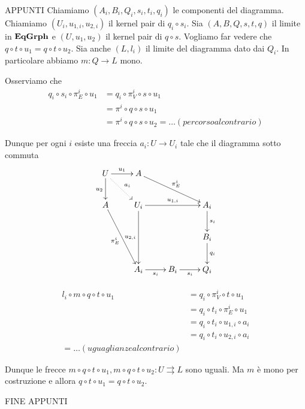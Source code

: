 APPUNTI
Chiamiamo $(A_i, B_i, Q_i, s_i, t_i, q_i)$ le componenti del diagramma. Chiamiamo $(U_i, u_{1, i} , u_{2,i})$ il kernel pair di $q_i\circ s_i$.  Sia $(A, B, Q, s,t,q )$ il limite in $\mathbf{EqGrph}$ e $(U, u_1, u_2)$ il kernel pair di $q\circ s$. Vogliamo far vedere che $q\circ t \circ u_1= q\circ t\circ u_2$. Sia anche $(L, l_i)$ il limite del diagramma dato dai $Q_i$. In particolare abbiamo $m\colon Q\to L$ mono.

Osserviamo che 
\begin{align*}
q_i\circ s_i\circ \pi^i_E\circ u_1 &= q_i\circ \pi^i_V\circ s\circ u_1\\&= \pi^i\circ q\circ s\circ u_1\\&=\pi^i\circ q\circ s\circ u_2=\dots (percorso al contrario)
\end{align*}

Dunque per ogni $i$ esiste una freccia $a_i\colon U\to U_{i}$ tale che il diagramma sotto commuta
\[
\xymatrix{U \ar@{.>}[dr]^{a_i}\ar[r]^{u_1} \ar[d]_{u_2}& A \ar[drr]^{\pi^i_E}\\A \ar[ddr]_{\pi^i_E}&U_i \ar[dd]_{u_{2,i}} \ar[rr]^{u_{1,i}}& & A_i \ar[d]^{s_i}\\
& & &B_i \ar[d]^{q_i}\\&A_i \ar[r]_{s_i} & B_i \ar[r]_{s_i} & Q_i}
\]


\begin{align*}
	l_i\circ m\circ q\circ t \circ u_1 &= q_i \circ \pi^{i}_V\circ t\circ u_1 \\&=q_i\circ t_i\circ \pi^i_E\circ u_1\\&=q_i\circ t_i\circ u_{1,i}\circ a_i\\&=q_i\circ t_i\circ u_{2,i}\circ a_i\\=\dots (uguaglianze al contrario)
\end{align*}

Dunque le frecce $m\circ q\circ t \circ u_1, m\circ q\circ t \circ u_2\colon U\rightrightarrows L$ sono uguali. Ma $m$ è mono per costruzione e allora $q\circ t \circ u_1=q\circ t \circ u_2$.

FINE APPUNTI 


